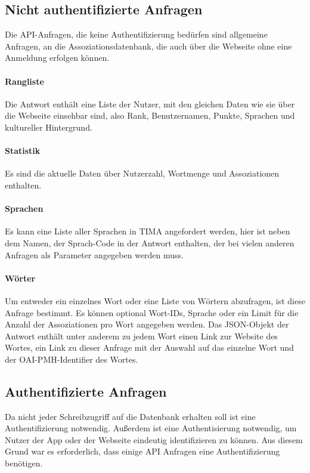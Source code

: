 \subsection{Nicht authentifizierte Anfragen}
Die API-Anfragen, die keine Authentifizierung bedürfen sind allgemeine Anfragen, an die Assoziationsdatenbank, die auch über die Webseite ohne eine Anmeldung erfolgen können.

\paragraph{Rangliste} Die Antwort enthält eine Liste der Nutzer, mit den gleichen Daten wie sie über die Webseite einsehbar sind, also Rank, Benutzernamen, Punkte, Sprachen und kultureller Hintergrund.

\paragraph{Statistik} Es sind die aktuelle Daten über Nutzerzahl, Wortmenge und Assoziationen enthalten.

\paragraph{Sprachen} Es kann eine Liste aller Sprachen in TIMA angefordert werden, hier ist neben dem Namen, der Sprach-Code in der Antwort enthalten, der bei vielen anderen Anfragen als Parameter angegeben werden muss.

\paragraph{Wörter} Um entweder ein einzelnes Wort oder eine Liste von Wörtern abzufragen, ist diese Anfrage bestimmt. Es können optional Wort-IDs, Sprache oder ein Limit für die Anzahl der Assoziationen pro Wort angegeben werden. Das JSON-Objekt der Antwort enthält unter anderem zu jedem Wort einen Link zur Website des Wortes, ein Link zu dieser Anfrage mit der Auswahl auf das einzelne Wort und der OAI-PMH-Identifier des Wortes.

\subsection{Authentifizierte Anfragen}\label{subsec:authentifizierte_anfragen}
Da nicht jeder Schreibzugriff auf die Datenbank erhalten soll ist eine Authentifizierung notwendig. Außerdem ist eine Authentisierung notwendig, um Nutzer der App oder der Webseite eindeutig identifizieren zu können. Aus diesem Grund war es erforderlich, dass einige API Anfragen eine Authentifizierung benötigen.


